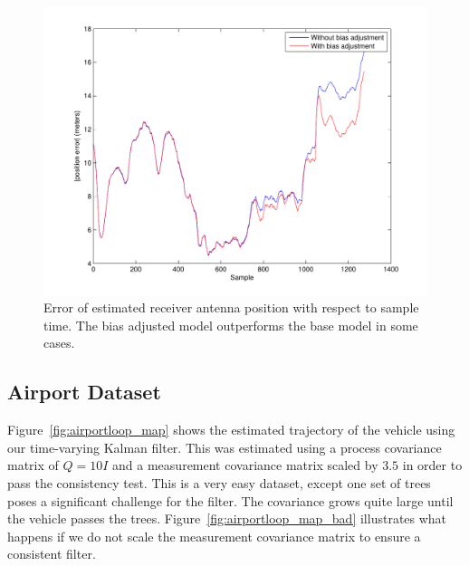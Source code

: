 \begin{figure}
\includegraphics[width=\columnwidth]{error_stationary}
\caption{Error of estimated receiver antenna position with respect to sample time.  The bias adjusted model outperforms the base model in some cases.}
\label{fig:stationary_error}
\end{figure}

\subsection{Airport Dataset}
Figure~\ref{fig:airportloop_map} shows the estimated trajectory of the vehicle using our time-varying Kalman filter.  This was estimated using a process covariance matrix of $Q = 10I$ and a measurement covariance matrix scaled by $3.5$ in order to pass the consistency test.  This is a very easy dataset, except one set of trees poses a significant challenge for the filter.  The covariance grows quite large until the vehicle passes the trees.  Figure~\ref{fig:airportloop_map_bad} illustrates what happens if we do not scale the measurement covariance matrix to ensure a consistent filter.

